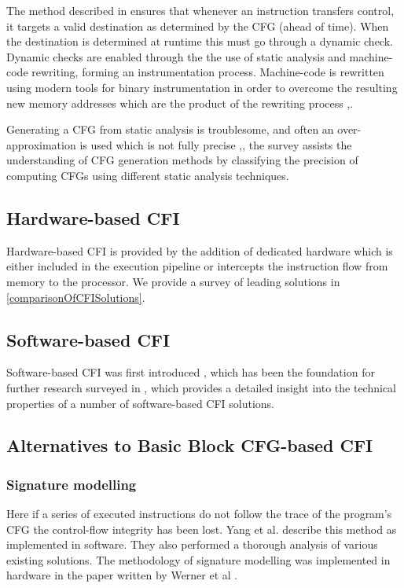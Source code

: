 The method described in \cite{Abadi2005} ensures that whenever an instruction transfers control, it targets a valid destination as determined by the CFG (ahead of time). When the destination is determined at runtime this must go through a dynamic check. Dynamic checks are enabled through the the use of static analysis and machine-code rewriting, forming an instrumentation process. Machine-code is rewritten using modern tools for binary instrumentation in order to overcome the resulting new memory addresses which are the product of the rewriting process \cite{Edwards2001},\cite{Srivastava1994}.

Generating a CFG from static analysis is troublesome, and often an over-approximation is used which is not fully precise \cite{Carlini2015},\cite{Kinder2012}, the survey \cite{Burow} assists the understanding of CFG generation methods by classifying the precision of computing CFGs using different static analysis techniques.

\subsection{Hardware-based CFI}

Hardware-based CFI is provided by the addition of dedicated hardware which is either included in the execution pipeline or intercepts the instruction flow from memory to the processor. We provide a survey of leading solutions in \ref{comparisonOfCFISolutions}.

\subsection{Software-based CFI}

Software-based CFI was first introduced \cite{Abadi2005}, which has been the foundation for further research surveyed in \cite{Burow}, which provides a detailed insight into the technical properties of a number of software-based CFI solutions.

\subsection{Alternatives to Basic Block CFG-based CFI}

\subsubsection{Signature modelling}
Here if a series of executed instructions do not follow the trace of the program’s CFG the control-flow integrity has been lost. Yang et al. \cite{Yang2013} describe this method as implemented in software. They also performed a thorough analysis of various existing solutions. The methodology of signature modelling was implemented in hardware in the paper written by Werner et al \cite{Werner2016}.

